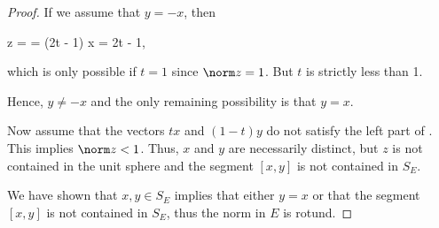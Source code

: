 \begin{proof}
  If we assume that \( y = -x \), then
  \begin{balign*}
    \norm z
    =
    =
    (2t - 1) \norm x
    =
    2t - 1,
  \end{balign*}
  which is only possible if \( t = 1 \) since \( \norm z = 1 \). But \( t \) is strictly less than 1.

  Hence, \( y \neq -x \) and the only remaining possibility is that \( y = x \).

  Now assume that the vectors \( tx \) and \( (1-t)y \) do not satisfy the left part of . This implies \( \norm z < 1 \). Thus, \( x \) and \( y \) are necessarily distinct, but \( z \) is not contained in the unit sphere and the segment \( [x, y] \) is not contained in \( S_E \).

  We have shown that \( x, y \in S_E \) implies that either \( y = x \) or that the segment \( [x, y] \) is not contained in \( S_E \), thus the norm in \( E \) is rotund.
\end{proof}

